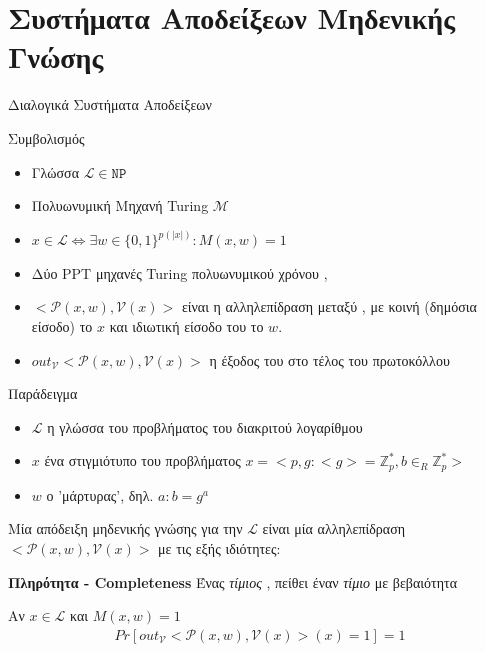 \documentclass[handout]{beamer}
\begin{document}
\section{Συστήματα Αποδείξεων Μηδενικής Γνώσης}
\begin{frame}[allowframebreaks]{Διαλογικά Συστήματα Αποδείξεων}
\begin{block}{Συμβολισμός}
\begin{itemize}
\item Γλώσσα $ \mathcal{L} \in \mathtt{NP}$
\item Πολυωνυμική Mηχανή Turing $\mathcal{M}$
\item $x \in \mathcal{L} \Leftrightarrow \exists w \in \{0,1\}^{p(|x|)}: M(x,w) = 1$
\item Δύο PPT μηχανές Turing πολυωνυμικού χρόνου \prv, \ver
\item $<\mathcal{P}(x,w), \mathcal{V}(x)>$ είναι η αλληλεπίδραση μεταξύ  \prv, \ver με κοινή (δημόσια είσοδο) το $x$ και ιδιωτική είσοδο του \prv το $w$.
\item $out_\mathcal{V}{<\mathcal{P}(x,w), \mathcal{V}(x)>}$ η έξοδος του \ver στο τέλος του πρωτοκόλλου
\end{itemize}
\end{block}

\framebreak

\begin{block}{Παράδειγμα}
\begin{itemize}
\item $\mathcal{L}$ η γλώσσα του προβλήματος του διακριτού λογαρίθμου
\item $x$ ένα στιγμιότυπο του προβλήματος $x=<p,g: <g>= \mathbb{Z}_p^*, b  \in_R \mathbb{Z}_p^*>$
\item $w$ ο 'μάρτυρας', δηλ. $a: b = g^a$
\end{itemize}
\end{block}

\framebreak

Μία απόδειξη μηδενικής γνώσης για την $ \mathcal{L} $ είναι μία αλληλεπίδραση $<\mathcal{P}(x,w), \mathcal{V}(x)>$ με τις εξής ιδιότητες:

\begin{block}{\textbf{Πληρότητα - Completeness}}  
Ένας \emph{τίμιος} \prv, πείθει έναν \emph{τίμιο} \ver με  βεβαιότητα 

Αν  $x \in \mathcal{L}$ και $M(x,w) = 1$
\begin{align*}
Pr[out_{\mathcal{V}}<\mathcal{P}(x,w), \mathcal{V}(x)>(x)=1] = 1  
\end{align*}
\end{block} 


\end{frame}
\end{document}
